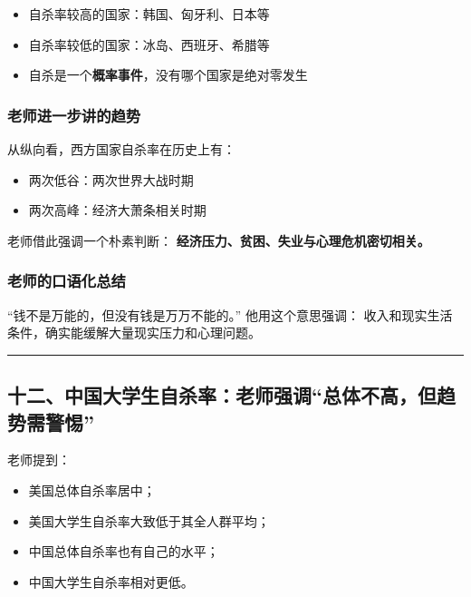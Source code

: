 \documentclass[
  chinese,
  9pt,
  a4paper,
]{ctexart}
\providecommand{\tightlist}{%
  \setlength{\itemsep}{0pt}\setlength{\parskip}{0pt}}
\begin{document}
\begin{itemize}
\tightlist
\item
  自杀率较高的国家：韩国、匈牙利、日本等
\item
  自杀率较低的国家：冰岛、西班牙、希腊等
\item
  自杀是一个\textbf{概率事件}，没有哪个国家是绝对零发生
\end{itemize}

\subsubsection{老师进一步讲的趋势}\label{ux8001ux5e08ux8fdbux4e00ux6b65ux8bb2ux7684ux8d8bux52bf}

从纵向看，西方国家自杀率在历史上有：

\begin{itemize}
\tightlist
\item
  两次低谷：两次世界大战时期
\item
  两次高峰：经济大萧条相关时期
\end{itemize}

老师借此强调一个朴素判断：
\textbf{经济压力、贫困、失业与心理危机密切相关。}

\subsubsection{老师的口语化总结}\label{ux8001ux5e08ux7684ux53e3ux8bedux5316ux603bux7ed3}

``钱不是万能的，但没有钱是万万不能的。'' 他用这个意思强调：
收入和现实生活条件，确实能缓解大量现实压力和心理问题。

\begin{center}\rule{0.5\linewidth}{0.5pt}\end{center}

\subsection{十二、中国大学生自杀率：老师强调``总体不高，但趋势需警惕''}\label{ux5341ux4e8cux4e2dux56fdux5927ux5b66ux751fux81eaux6740ux7387ux8001ux5e08ux5f3aux8c03ux603bux4f53ux4e0dux9ad8ux4f46ux8d8bux52bfux9700ux8b66ux60d5}

老师提到：

\begin{itemize}
\tightlist
\item
  美国总体自杀率居中；
\item
  美国大学生自杀率大致低于其全人群平均；
\item
  中国总体自杀率也有自己的水平；
\item
  中国大学生自杀率相对更低。
\end{itemize}
\end{document}

